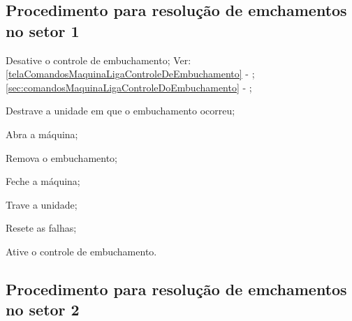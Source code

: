 \subsection{Procedimento para resolução de emchamentos no setor 1}



\begin{procedureFixingIsuesSector1}

  \item[\ding{\dingNumber}] Desative o controle de embuchamento; Ver: 
  \ifmachineType
  \ref{telaComandosMaquinaLigaControleDeEmbuchamento} - ;
  \else
  \ref{sec:comandosMaquinaLigaControleDoEmbuchamento} - ;
  \fi
  \ifmachineType
  \item[\ding{\dingNumber}] Destrave a unidade em que o embuchamento ocorreu;
  \item[\ding{\dingNumber}] Abra a máquina;
  \fi
  \item[\ding{\dingNumber}] Remova o embuchamento;
  \ifmachineType
  \item[\ding{\dingNumber}] Feche a máquina;
  \item[\ding{\dingNumber}] Trave a unidade;
  \fi
  \item[\ding{\dingNumber}] Resete as falhas;
  \item[\ding{\dingNumber}] Ative o controle de embuchamento.
  
\end{procedureFixingIsuesSector1}

\subsection{Procedimento para resolução de emchamentos no setor 2}



